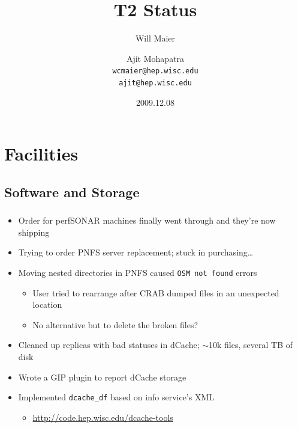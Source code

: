 \documentclass{beamer}
\title{T2 Status}
\author[Maier, Mohapatra]{
    Will Maier \and Ajit Mohapatra\\
    {\tt wcmaier@hep.wisc.edu}\\
    {\tt ajit@hep.wisc.edu}}
\institute[Wisconsin]{University of Wisconsin - High Energy Physics}
\date{2009.12.08}
\newcommand{\ca}{\ensuremath{\sim}}
\begin{document}
\begin{frame}
    \titlepage
\end{frame}


\section{Facilities}
\subsection{Software and Storage}
\begin{frame}
\frametitle{}

\begin{itemize}
	\item Order for perfSONAR machines finally went through and they're now shipping
	\item Trying to order PNFS server replacement; stuck in purchasing\ldots{}
	\item Moving nested directories in PNFS caused {\tt OSM not found} errors
	\begin{itemize}
		\item User tried to rearrange after CRAB dumped files in an unexpected location
		\item No alternative but to delete the broken files?
	\end{itemize}
	\item Cleaned up replicas with bad statuses in dCache; \ca{}10k files, several TB of disk
	\item Wrote a GIP plugin to report dCache storage
	\item Implemented {\tt dcache\_df} based on info service's XML
	\begin{itemize}
		\item \url{http://code.hep.wisc.edu/dcache-tools}
	\end{itemize}
\end{itemize}
\end{frame}
\end{document}
